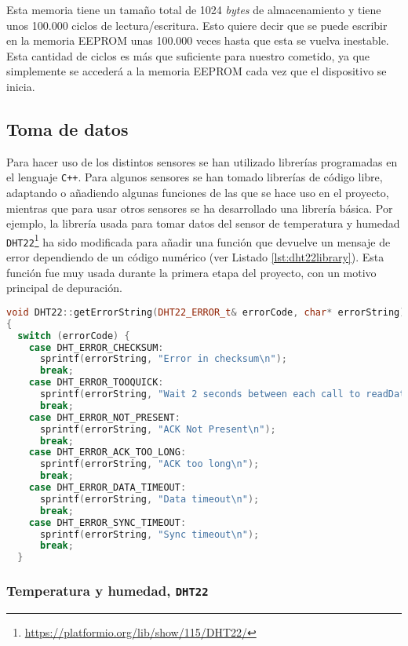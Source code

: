 Esta memoria tiene un tamaño total de 1024 \textit{bytes} de almacenamiento y tiene unos 100.000 ciclos de lectura/escritura. Esto quiere decir que se puede escribir en la memoria \ac{EEPROM} unas 100.000 veces hasta que esta se vuelva inestable. Esta cantidad de ciclos es más que suficiente para nuestro cometido, ya que simplemente se accederá a la memoria \ac{EEPROM} cada vez que el dispositivo se inicia. 

\subsection{Toma de datos}
\label{ss:implementaciondatos}

Para hacer uso de los distintos sensores se han utilizado librerías programadas en el lenguaje \texttt{C++}. Para algunos sensores se han tomado librerías de código libre, adaptando o añadiendo algunas funciones de las que se hace uso en el proyecto, mientras que para usar otros sensores se ha desarrollado una librería básica. Por ejemplo, la librería usada para tomar datos del sensor de temperatura y humedad \texttt{DHT22}\footnote{\url{https://platformio.org/lib/show/115/DHT22/}} ha sido modificada para añadir una función que devuelve un mensaje de error dependiendo de un código numérico (ver Listado \ref{lst:dht22library}). Esta función fue muy usada durante la primera etapa del proyecto, con un motivo principal de depuración. 

\begin{lstlisting}[language=c++,captionpos=t,caption={\textbf{Ejemplo de funcionalidad añadida a librería de código libre del sensor DHT22.}},label={lst:dht22library}]
void DHT22::getErrorString(DHT22_ERROR_t& errorCode, char* errorString)
{
  switch (errorCode) {
    case DHT_ERROR_CHECKSUM:
      sprintf(errorString, "Error in checksum\n");
      break;
    case DHT_ERROR_TOOQUICK:
      sprintf(errorString, "Wait 2 seconds between each call to readData\n");
      break;
    case DHT_ERROR_NOT_PRESENT:
      sprintf(errorString, "ACK Not Present\n");
      break;
    case DHT_ERROR_ACK_TOO_LONG:
      sprintf(errorString, "ACK too long\n");
      break;
    case DHT_ERROR_DATA_TIMEOUT:
      sprintf(errorString, "Data timeout\n");
      break;
    case DHT_ERROR_SYNC_TIMEOUT:
      sprintf(errorString, "Sync timeout\n");
      break;
  }
\end{lstlisting}

\subsubsection{Temperatura y humedad, \texttt{DHT22}}

